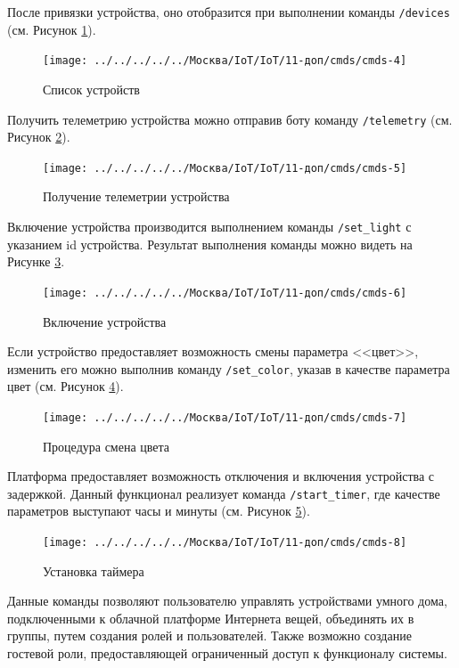 \documentclass[a4paper,14pt]{extarticle}
\begin{document}
После привязки устройства, оно отобразится при выполнении команды \texttt{/devices} (см. Рисунок \ref{fig:cmds-4}).

\begin{figure}[h!]
	\centering
	\texttt{[image: ../../../../../Москва/IoT/IoT/11-доп/cmds/cmds-4]}
	\caption{Список устройств}
	\label{fig:cmds-4}
\end{figure}

Получить телеметрию устройства можно отправив боту команду \texttt{/telemetry} (см. Рисунок \ref{fig:cmds-5}).

\begin{figure}[h!]
	\centering
	\texttt{[image: ../../../../../Москва/IoT/IoT/11-доп/cmds/cmds-5]}
	\caption{Получение телеметрии устройства}
	\label{fig:cmds-5}
\end{figure}


Включение устройства производится выполнением команды \texttt{/set\_light} с указанием \mbox{id} устройства. Результат выполнения команды можно видеть на Рисунке \ref{fig:cmds-6}.

\begin{figure}[h!]
	\centering
	\texttt{[image: ../../../../../Москва/IoT/IoT/11-доп/cmds/cmds-6]}
	\caption{Включение устройства}
	\label{fig:cmds-6}
\end{figure}

Если устройство предоставляет возможность смены параметра <<цвет>>, изменить его можно выполнив команду \texttt{/set\_color}, указав в качестве параметра цвет (см. Рисунок \ref{fig:cmds-7}). 

\begin{figure}[h!]
	\centering
	\texttt{[image: ../../../../../Москва/IoT/IoT/11-доп/cmds/cmds-7]}
	\caption{Процедура смена цвета}
	\label{fig:cmds-7}
\end{figure}


Платформа предоставляет возможность отключения и включения устройства с задержкой. Данный функционал реализует команда \texttt{/start\_timer}, где качестве параметров выступают часы и минуты (см. Рисунок \ref{fig:cmds-8}). 
\begin{figure}[h!]
	\centering
	\texttt{[image: ../../../../../Москва/IoT/IoT/11-доп/cmds/cmds-8]}
	\caption{Установка таймера}
	\label{fig:cmds-8}
\end{figure}
\newpage
Данные команды позволяют пользователю управлять устройствами умного дома, подключенными к облачной платформе Интернета вещей, объединять их в группы, путем создания ролей и пользователей. Также возможно создание гостевой роли, предоставляющей ограниченный доступ к функционалу системы.
\end{document}
